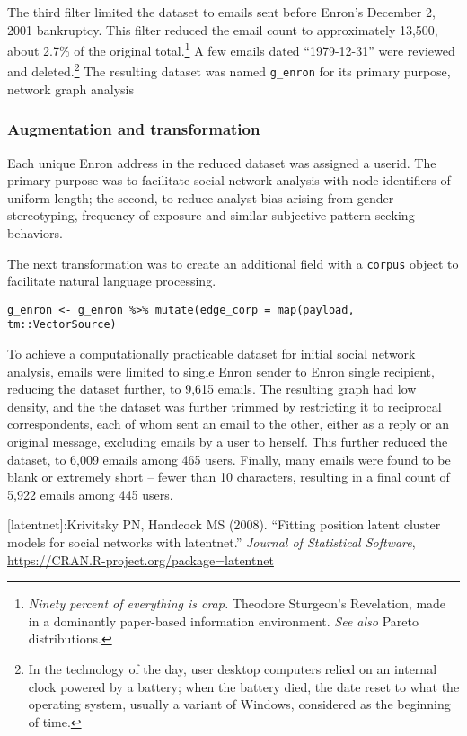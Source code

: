 \documentclass[]{article}
\let\rmarkdownfootnote\footnote%
\def\footnote{\protect\rmarkdownfootnote}
\begin{document}
The third filter limited the dataset to emails sent before Enron's
December 2, 2001 bankruptcy. This filter reduced the email count to
approximately 13,500, about 2.7\% of the original total.\footnote{\emph{Ninety
  percent of everything is crap.} Theodore Sturgeon's Revelation, made
  in a dominantly paper-based information environment. \emph{See also}
  Pareto distributions.} A few emails dated ``1979-12-31'' were reviewed
and deleted.\footnote{In the technology of the day, user desktop
  computers relied on an internal clock powered by a battery; when the
  battery died, the date reset to what the operating system, usually a
  variant of Windows, considered as the beginning of time.} The
resulting dataset was named \texttt{g\_enron} for its primary purpose,
network graph analysis

\hypertarget{augmentation-and-transformation}{%
\subsubsection{Augmentation and
transformation}\label{augmentation-and-transformation}}

Each unique Enron address in the reduced dataset was assigned a userid.
The primary purpose was to facilitate social network analysis with node
identifiers of uniform length; the second, to reduce analyst bias
arising from gender stereotyping, frequency of exposure and similar
subjective pattern seeking behaviors.

The next transformation was to create an additional field with a
\texttt{corpus} object to facilitate natural language processing.

\begin{verbatim}
g_enron <- g_enron %>% mutate(edge_corp = map(payload, tm::VectorSource)
\end{verbatim}

To achieve a computationally practicable dataset for initial social
network analysis, emails were limited to single Enron sender to Enron
single recipient, reducing the dataset further, to 9,615 emails. The
resulting graph had low density, and the the dataset was further trimmed
by restricting it to reciprocal correspondents, each of whom sent an
email to the other, either as a reply or an original message, excluding
emails by a user to herself. This further reduced the dataset, to 6,009
emails among 465 users. Finally, many emails were found to be blank or
extremely short -- fewer than 10 characters, resulting in a final count
of 5,922 emails among 445 users.

{[}latentnet{]}:Krivitsky PN, Handcock MS (2008). ``Fitting position
latent cluster models for social networks with latentnet.''
\emph{Journal of Statistical Software},
\url{https://CRAN.R-project.org/package=latentnet}
\end{document}
